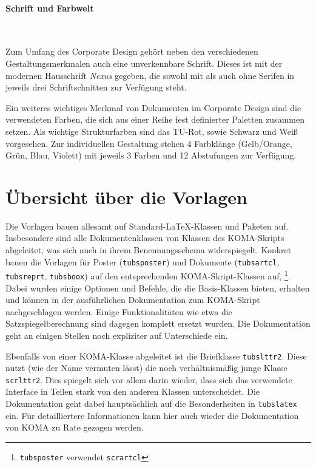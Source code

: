 \paragraph{Schrift und Farbwelt}\hfill\\
\begin{minipage}[t]{0.45\textwidth}
\vspace*{0pt}
\centering{}%
\end{minipage}
\begin{minipage}[t]{0.55\textwidth}
\vspace*{0pt}
Zum Umfang des Corporate Design gehört neben den verschiedenen
Gestaltungsmerkmalen auch eine unverkennbare Schrift.
Dieses ist mit der modernen Hausschrift \emph{Nexus} gegeben, die sowohl mit als auch
ohne Serifen in jeweils drei Schriftschnitten zur Verfügung steht.

Ein weiteres wichtiges Merkmal von Dokumenten im Corporate Design sind
die verwendeten Farben, die sich aus einer Reihe fest definierter Paletten
zusammen setzen.
Als wichtige Strukturfarben sind das TU-Rot, sowie Schwarz und Weiß vorgesehen.
Zur individuellen Gestaltung stehen 4 Farbklänge (Gelb/Orange, Grün, Blau, Violett)
mit jeweils 3 Farben und 12 Abstufungen zur Verfügung.
\end{minipage}

\clearpage
\section{Übersicht über die Vorlagen}

Die Vorlagen bauen allesamt auf Standard-\LaTeX-Klassen und Paketen auf.
Insbesondere sind alle Dokumentenklassen von Klassen des KOMA-Skripts
abgeleitet, was sich auch in ihrem Benennungsschema widerspiegelt.
Konkret bauen die Vorlagen für Poster (\texttt{tubsposter}) und Dokumente
(\texttt{tubsartcl}, \texttt{tubsreprt}, \texttt{tubsboox}) auf
den entsprechenden KOMA-Skript-Klassen auf,%
\footnote{\texttt{tubsposter} verwendet \texttt{scrartcl}}.
Dabei wurden einige Optionen und Befehle, die die Basis-Klassen bieten, erhalten
und können in der ausführlichen Dokumentation zum KOMA-Skript\cite{koma-skript}
nachgeschlagen werden.
Einige Funktionalitäten wie etwa die Satzspiegelberechnung sind dagegen
komplett ersetzt wurden.
Die Dokumentation geht an einigen Stellen noch expliziter auf Unterschiede ein.

Ebenfalls von einer KOMA-Klasse abgeleitet ist die Briefklasse
\texttt{tubslttr2}.
Diese nutzt (wie der Name vermuten lässt) die noch verhältnismäßig junge
Klasse \texttt{scrlttr2}. Dies spiegelt sich vor allem darin wieder, dass sich
das verwendete Interface in Teilen stark von den anderen Klassen unterscheidet.
Die Dokumentation geht dabei hauptsächlich auf die Besonderheiten in
\texttt{tubslatex} ein.
Für detailliertere Informationen kann hier auch wieder die Dokumentation von
KOMA\cite{koma-skript} zu Rate gezogen werden.

